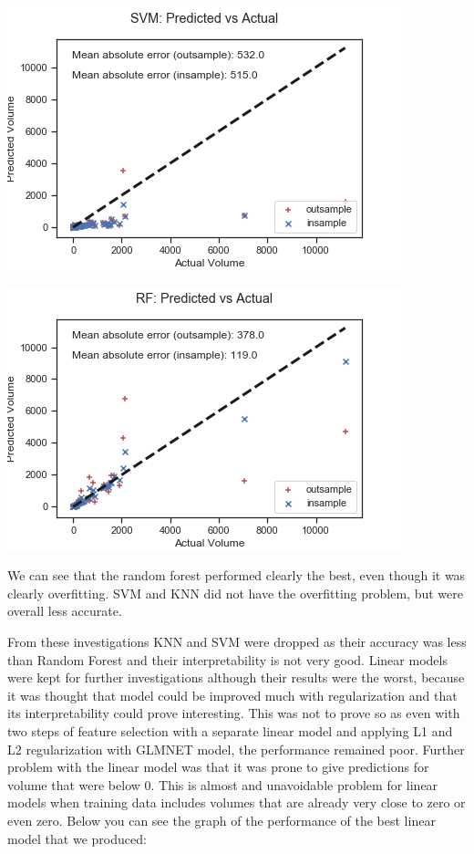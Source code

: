 \documentclass[12pt,a4paper,leqno]{report}
\theoremstyle{plain}
\theoremstyle{definition}
\theoremstyle{remark}
\begin{document}
\bigskip
{
    \centering
    \includegraphics[width=\textwidth,height=\textheight,keepaspectratio]{predictions_unoptimized_simple_svm.png}
    \par
}
\bigskip

\bigskip
{
    \centering
    \includegraphics[width=\textwidth,height=\textheight,keepaspectratio]{predictions_unoptimized_simple_rf.png}
    \par
}
\bigskip

We can see that the random forest performed clearly the best, even though
it was clearly overfitting. SVM and KNN did not have the overfitting problem,
but were overall less accurate.

From these investigations KNN and SVM were dropped as their accuracy
was less than Random Forest and their interpretability is not very good.
Linear models were kept for further investigations although their results
were the worst, because it was thought that model could be improved much
with regularization and that its interpretability could prove interesting.
This was not to prove so as even with two steps of feature selection with
a separate linear model and applying L1 and L2 regularization with GLMNET
model, the performance remained poor. Further problem with the linear model
was that it was prone to give predictions for volume that were below 0. This
is almost and unavoidable problem for linear models when training data includes
volumes that are already very close to zero or even zero. Below you can see
the graph of the performance of the best linear model that we produced:
\end{document}
